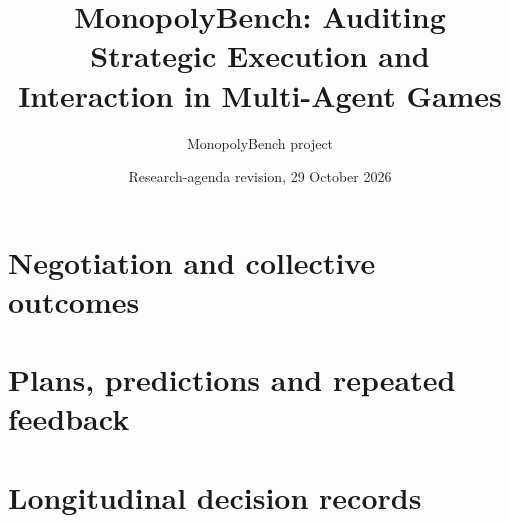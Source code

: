\documentclass[11pt,letterpaper]{article}
\title{MonopolyBench: Auditing Strategic Execution and Interaction in Multi-Agent Games}
\author{MonopolyBench project}
\date{Research-agenda revision, 29 October 2026}
\begin{document}

\maketitle
\begin{abstract}

\end{abstract}




\section{Negotiation and collective outcomes}
\label{sec:negotiation-extended}

\section{Plans, predictions and repeated feedback}
\label{sec:temporal-extended}








\begingroup
\small


\endgroup
\clearpage
\appendix





\clearpage
\section{Longitudinal decision records}
\label{app:temporal-exhibits}

\FloatBarrier

\end{document}
